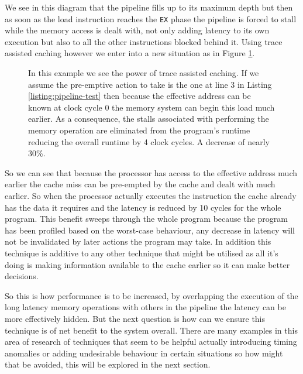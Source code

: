 We see in this diagram that the pipeline fills up to its maximum depth but then as soon as the load instruction reaches the \texttt{EX} phase the pipeline is forced to stall while the memory access is dealt with, not only adding latency to its own execution but also to all the other instructions blocked behind it. Using trace assisted caching however we enter into a new situation as in Figure \ref{fig:ideal-pipeline}.

\begin{figure}
	\begin{center}
		
		\caption[Pipeline Diagram - With Trace Assisted Caching]{In this example we see the power of trace assisted caching. If we assume the pre-emptive action to take is the one at line 3 in Listing \ref{listing:pipeline-test} then because the effective address can be known at clock cycle 0 the memory system can begin this load much earlier. As a consequence, the stalls associated with performing the memory operation are eliminated from the program's runtime reducing the overall runtime by 4 clock cycles. A decrease of nearly 30\%.}
		\label{fig:ideal-pipeline}
	\end{center}
\end{figure}


So we can see that because the processor has access to the effective address much earlier the cache miss can be pre-empted by the cache and dealt with much earlier. So when the processor actually executes the instruction the cache already has the data it requires and the latency is reduced by 10 cycles for the whole program. This benefit sweeps through the whole program because the program has been profiled based on the worst-case behaviour, any decrease in latency will not be invalidated by later actions the program may take. In addition this technique is additive to any other technique that might be utilised as all it's doing is making information available to the cache earlier so it can make better decisions. 

So this is how performance is to be increased, by overlapping the execution of the long latency memory operations with others in the pipeline the latency can be more effectively hidden. But the next question is how can we ensure this technique is of net benefit to the system overall. There are many examples in this area of research of techniques that seem to be helpful actually introducing timing anomalies or adding undesirable behaviour in certain situations so how might that be avoided, this will be explored in the next section.

